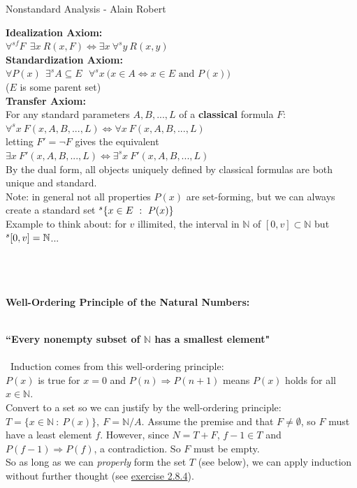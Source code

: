 \documentclass{article}
\newcommand{\hsp}[1][5]{\hspace{0.#1 cm}}
\newcommand{\hcm}[1][1]{\hspace{#1 cm}}
\newcommand{\imp}{\Rightarrow}
\newcommand{\st}{\ : \ }
\newcommand{\N}{\mathbb{N}}
\newcommand{\ch}[1]{\text{#1}}
\newcommand{\dspt}{\displaystyle}
\begin{document}
\begin{center}
Nonstandard Analysis - Alain Robert
\end{center}
\begin{flushleft}
\hangindent=1cm 

\textbf{Idealization Axiom:}\\\hcm
$\forall^{sf} F\ \ \exists x\ R(x,F) \iff \exists x\ \forall^{s} y\ R(x,y)$\\[6pt]

\textbf{Standardization Axiom:}\\\hcm
$\dspt \forall P(x)\ \ \exists^s A\subseteq E\ \ \ \forall^sx\ \big(x\in A \iff x\in E \ch{ and } P(x) \big)$\\\hcm($E$ is some parent set)\\[6pt]

\textbf{Transfer Axiom:}\\\hcm
For any standard parameters $A, B, ..., L$ of a \textbf{classical} formula $F$:
$\forall^s x\ F(x, A, B, ..., L) \iff \forall x\ F(x, A, B, ..., L)$\\[4pt]\hcm
letting $F' = \neg F$ gives the equivalent $\exists x\ F'(x, A, B, ..., L) \iff \exists^s x\ F'(x, A, B, ..., L)$\\[4pt]\hcm
By the dual form, all objects uniquely defined by classical formulas are both unique and standard.\\[4pt]\hcm
Note: in general not all properties $P(x)$ are set-forming, but we can always create a standard set $\vphantom{k}^s\{x\in E \st P(x)\}$\\[4pt]\hcm
Example to think about: for $v$ illimited, the interval in $\N$ of $[0,v] \subset \N$ but $\vphantom{k}^s[0,v] = \N$...\\\ \\\ \\\ 


\hypertarget{wellorder}{\textbf{Well-Ordering Principle of the Natural Numbers:}}\\\hsp
\textbf{``Every nonempty subset of $\N$ has a smallest element"}\\\ \\\ 
Induction comes from this well-ordering principle:\\[6pt]\hsp
$P(x)$ is true for $x=0$ and $P(n) \imp P(n+1)$ means $P(x)$ holds for all $x\in \N$.\\[6pt]\hsp\hsp
Convert to a set so we can justify by the well-ordering principle: $T = \{x \in \N \st P(x)\},\ F = \N/A$. Assume the premise and that $F \neq \emptyset$, so $F$ must have a least element $f$. However, since $N=T+F$, $f-1 \in T$ and $P(f-1) \imp P(f)$, a contradiction. So $F$ must be empty.\\[6pt]\hsp
So as long as we can \textit{properly} form the set $T$ (see below), we can apply induction without further thought (see \hyperlink{2.8.4}{exercise 2.8.4}).\\\ 


\end{flushleft}
\end{document}
